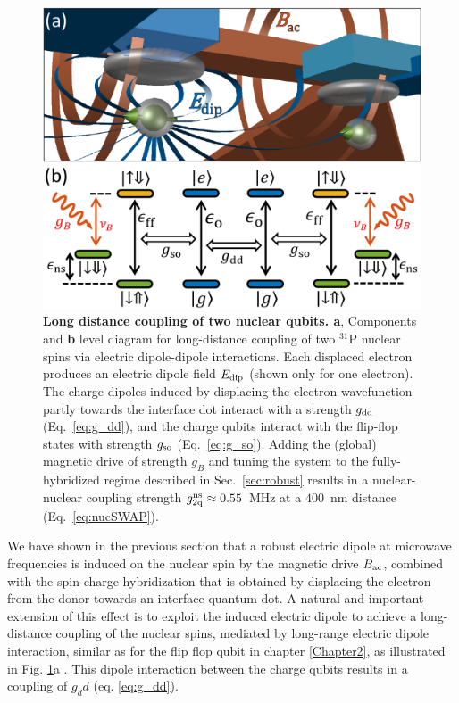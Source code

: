\begin{figure}
\centering
\includegraphics[width=0.9\columnwidth]{fig5_2-qubit_nuc}
\caption[Long distance coupling of two nuclear qubits]{
\textbf{Long distance coupling of two nuclear qubits. a}, Components and \textbf{b} level diagram for long-distance coupling of two $^{31}$P nuclear spins via electric dipole-dipole interactions. Each displaced electron produces an electric dipole field $E_{\rm dip}$ (shown only for one electron). The charge dipoles induced by displacing the electron wavefunction partly towards the interface dot interact with a strength $g_{\rm dd}$ (Eq.~\ref{eq:g_dd}), and the charge qubits interact with the flip-flop states with strength $g_{\rm so}$ (Eq.~\ref{eq:g_so}). Adding the (global) magnetic drive of strength $g_B$ and tuning the system to the fully-hybridized regime described in Sec.~\ref{sec:robust} results in a nuclear-nuclear coupling strength $g_{\rm 2q}^{\rm ns} \approx 0.55$~MHz at a $400$~nm distance (Eq.~\ref{eq:nucSWAP}).
}
\label{fig:2-qubit_nuc}
\end{figure}

We have shown in the previous section that a robust electric dipole at microwave frequencies is induced on the nuclear spin by the magnetic drive $B_{\rm ac}$, combined with the spin-charge hybridization that is obtained by displacing the electron from the donor towards an interface quantum dot. A natural and important extension of this effect is to exploit the induced electric dipole to achieve a long-distance coupling of the nuclear spins, mediated by long-range electric dipole interaction, similar as for the flip flop qubit in chapter \ref{Chapter2}, as illustrated in Fig. \ref{fig:2-qubit_nuc}a \cite{Tosi2017}. This dipole interaction between the charge qubits results in a coupling of $g_dd$ (eq. \eqref{eq:g_dd}). 

